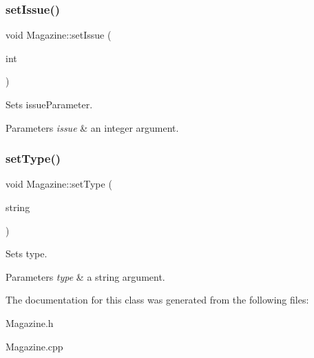 \subsubsection{\texorpdfstring{set\+Issue()}{setIssue()}}
{\footnotesize\ttfamily void Magazine\+::set\+Issue (\begin{DoxyParamCaption}\item[{int}]{ }\end{DoxyParamCaption})}



Sets issue\+Parameter. 


\begin{DoxyParams}{Parameters}
{\em issue} & an integer argument. \\
\hline
\end{DoxyParams}
\mbox{\label{classMagazine_a29b2f7bd3ec5a76e9a5b0d06d64dec68}} 
\subsubsection{\texorpdfstring{set\+Type()}{setType()}}
{\footnotesize\ttfamily void Magazine\+::set\+Type (\begin{DoxyParamCaption}\item[{string}]{ }\end{DoxyParamCaption})}



Sets type. 


\begin{DoxyParams}{Parameters}
{\em type} & a string argument. \\
\hline
\end{DoxyParams}


The documentation for this class was generated from the following files\+:\begin{DoxyCompactItemize}
\item 
Magazine.\+h\item 
Magazine.\+cpp\end{DoxyCompactItemize}
